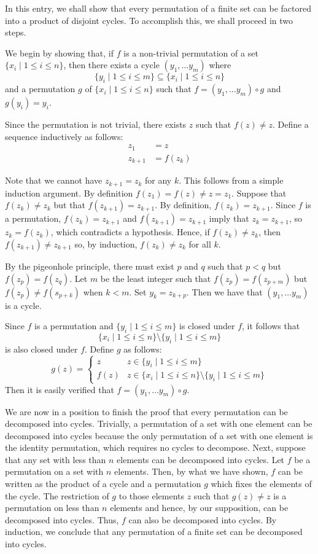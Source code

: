 \documentclass[12pt]{article}
\begin{document}
In this entry, we shall show that every permutation of a 
finite set can be factored into a product of disjoint cycles.  
To accomplish this, we shall proceed in two steps.

We begin by showing that, if $f$ is a non-trivial 
permutation of a set $\{ x_i \mid 1 \le i \le n \}$,
then there exists a cycle $(y_1, \ldots y_m)$ where
\[
\{ y_i \mid 1 \le i \le m \} \subseteq
\{ x_i \mid 1 \le i \le n \}
\]
and a permutation $g$ of $\{ x_i \mid 1 \le i \le n \}$
such that $f = (y_1, \ldots y_m) \circ g$ and $g(y_i) = y_i$.

Since the permutation is not trivial, there exists
$z$ such that $f(z) \neq z$.  Define a sequence
inductively as follows:
\begin{align*}
z_1 &= z \\
z_{k+1} &= f(z_k)
\end{align*}

Note that we cannot have $z_{k+1} = z_k$ for any $k$.
This follows from a simple induction argument.  By
definition $f(z_1) = f(z) \neq z = z_1$.  Suppose 
that $f(z_k) \neq z_k$ but that $f(z_{k+1}) = z_{k+1}$.
By definition, $f(z_k) = z_{k+1}$.  Since $f$ is a 
permutation, $f(z_k) = z_{k+1}$ and $f(z_{k+1}) = z_{k+1}$
imply that $z_k = z_{k+1}$, so $z_k = f(z_k)$, which
contradicts a hypothesis.  Hence, if $f(z_k) \neq z_k$,
then $f(z_{k+1}) \neq z_{k+1}$ so, by induction,
$f(z_k) \neq z_k$ for all $k$. 

By the pigeonhole principle, there must exist $p$ and $q$
such that $p < q$ but $f(z_p) = f(z_q)$.  Let $m$ be the
least integer such that $f(z_p) = f(z_{p+m})$ but
$f(z_p) \neq f(s_{p+k})$ when $k < m$.  Set $y_k = z_{k+p}$.
Then we have that $(y_1, \ldots y_m)$ is a cycle.

Since $f$ is a permutation and $\{ y_i \mid 1 \le i \le m \}$
is closed under $f$, it follows that 
\[
\{ x_i \mid 1 \le i \le n \} \setminus 
\{ y_i \mid 1 \le i \le m \}
\]
is also closed under $f$.  Define $g$ as follows:
\[
g(z) =
\begin{cases}
z    & z \in \{ y_i \mid 1 \le i \le m \} \\
f(z) & z \in \{ x_i \mid 1 \le i \le n \} \setminus 
\{ y_i \mid 1 \le i \le m \}
\end{cases}
\]
Then it is easily verified that 
$f = (y_1, \ldots y_m) \circ g$.

We are now in a position to finish the proof that
every permutation can be decomposed into cycles.
Trivially, a permutation of a set with one element
can be decomposed into cycles because the only
permutation of a set with one element is the
identity permutation, which requires no cycles
to decompose.  Next, suppose that any set with less
than $n$ elements can be decomposed into cycles.
Let $f$ be a permutation on a set with $n$ elements.
Then, by what we have shown, $f$ can be written as
the product of a cycle and a permutation $g$ which
fixes the elements of the cycle.  The restriction of
$g$ to those elements $z$ such that $g(z) \neq z$
is a permutation on less than $n$ elements and
hence, by our supposition, can be decomposed into 
cycles.  Thus, $f$ can also be decomposed into
cycles.  By induction, we conclude that any
permutation of a finite set can be decomposed into cycles.
\end{document}
